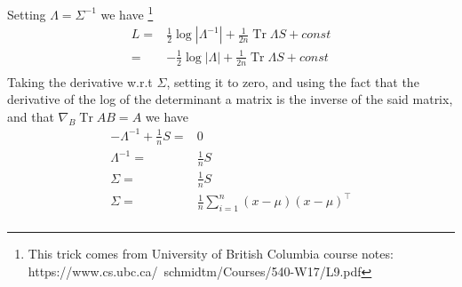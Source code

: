 \documentclass[12pt,english]{amsart}
\theoremstyle{definition}
\DeclareMathOperator{\Tr}{Tr}
\begin{document}
Setting $\Lambda=\Sigma^{-1}$ we have \footnote{This trick comes from University of British Columbia course notes: https://www.cs.ubc.ca/~schmidtm/Courses/540-W17/L9.pdf}
\begin{equation}
\begin{split}
    L 
=& \frac{1}{2}\log|\Lambda^{-1}| + \frac{1}{2n}\Tr\Lambda S + const\\
=& -\frac{1}{2}\log|\Lambda| + \frac{1}{2n}\Tr\Lambda S + const\\
\end{split}
\label{eq:loglike6}
\end{equation}
Taking the derivative w.r.t $\Sigma$, setting it to zero, and using the fact that the derivative of the log of the determinant a matrix is the inverse of the said matrix, and that $\nabla_B \Tr AB=A$ we have
\begin{equation}
\begin{split}
 -\Lambda^{-1} + \frac{1}{n}S=&0\\
 \Lambda^{-1} =& \frac{1}{n}S\\
\Sigma =& \frac{1}{n}S\\
\Sigma =& \frac{1}{n}\sum_{i=1}^n(x-\mu)(x-\mu)^\top\\
\end{split}
\label{eq:loglike7}
\end{equation}
















\end{document}
